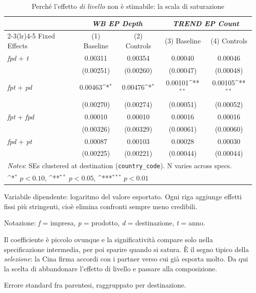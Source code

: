 \begin{table}[htbp]
\centering
\footnotesize
\caption{Perch\'e l'effetto \emph{di livello} non \`e stimabile: la scala di saturazione}
\label{tab:ladder}
\begin{threeparttable}
{
\def\sym#1{\ifmmode^{#1}\else\(^{#1}\)\fi}
\begin{tabular}{lcccc}
\toprule
 & \multicolumn{2}{c}{\textit{WB EP Depth}} & \multicolumn{2}{c}{\textit{TREND EP Count}} \\
\cmidrule(lr){2-3}\cmidrule(lr){4-5}
Fixed Effects & (1) Baseline & (2) Controls & (3) Baseline & (4) Controls \\
\midrule
\textit{fpd} + \textit{t} & 0.00311 & 0.00354 & 0.00040 & 0.00046 \\
 & (0.00251) & (0.00260) & (0.00047) & (0.00048) \\
\addlinespace
\textit{fpt} + \textit{pd} & 0.00463\sym{*} & 0.00476\sym{*} & 0.00101\sym{**} & 0.00105\sym{**} \\
 & (0.00270) & (0.00274) & (0.00051) & (0.00052) \\
\addlinespace
\textit{fpt} + \textit{fpd} & 0.00010 & 0.00010 & 0.00016 & 0.00016 \\
 & (0.00326) & (0.00329) & (0.00061) & (0.00060) \\
\addlinespace
\textit{fpd} + \textit{pt} & 0.00087 & 0.00103 & 0.00028 & 0.00030 \\
 & (0.00225) & (0.00221) & (0.00044) & (0.00044) \\
\midrule
\multicolumn{5}{l}{\footnotesize \textit{Notes}: SEs clustered at destination (\texttt{country\_code}). N varies across specs.} \\
\multicolumn{5}{l}{\footnotesize \sym{*} \(p<0.10\), \sym{**} \(p<0.05\), \sym{***} \(p<0.01\)} \\
\bottomrule
\end{tabular}
}
\begin{tablenotes}[flushleft]\footnotesize
\item Variabile dipendente: logaritmo del valore esportato. Ogni riga aggiunge effetti fissi pi\`u stringenti, cio\`e elimina confronti sempre meno credibili.
\item Notazione: \textit{f} = impresa, \textit{p} = prodotto, \textit{d} = destinazione, \textit{t} = anno.
\item Il coefficiente \`e piccolo ovunque e la significativit\`a compare solo nella specificazione intermedia, per poi sparire quando si satura. \`E il segno tipico della \emph{selezione}: la Cina firma accordi con i partner verso cui gi\`a esporta molto. Da qui la scelta di abbandonare l'effetto di livello e passare alla composizione.
\item Errore standard fra parentesi, raggruppato per destinazione.
\end{tablenotes}
\end{threeparttable}
\end{table}
